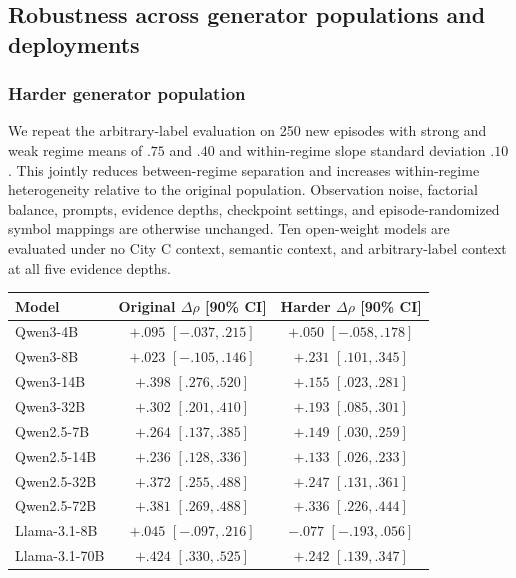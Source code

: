 \subsection{Robustness across generator populations and deployments}
\label{app:coin-city-robustness}

\subsubsection{Harder generator population}

We repeat the arbitrary-label evaluation on 250 new episodes with strong and weak regime means of $.75$ and $.40$ and within-regime slope standard deviation $.10$.
This jointly reduces between-regime separation and increases within-regime heterogeneity relative to the original population.
Observation noise, factorial balance, prompts, evidence depths, checkpoint settings, and episode-randomized symbol mappings are otherwise unchanged.
Ten open-weight models are evaluated under no City C context, semantic context, and arbitrary-label context at all five evidence depths.

\begin{center}
\begin{minipage}{0.90\linewidth}
\centering
{}
\label{tab:coin-city-generator-robustness}
\small
\begin{tabular}{lcc}
\toprule
Model & Original \(\Delta\rho\) [90\% CI] & Harder \(\Delta\rho\) [90\% CI] \\
\midrule
Qwen3-4B & $+.095$ $[-.037,.215]$ & $+.050$ $[-.058,.178]$ \\
Qwen3-8B & $+.023$ $[-.105,.146]$ & $+.231$ $[.101,.345]$ \\
Qwen3-14B & $+.398$ $[.276,.520]$ & $+.155$ $[.023,.281]$ \\
Qwen3-32B & $+.302$ $[.201,.410]$ & $+.193$ $[.085,.301]$ \\
Qwen2.5-7B & $+.264$ $[.137,.385]$ & $+.149$ $[.030,.259]$ \\
Qwen2.5-14B & $+.236$ $[.128,.336]$ & $+.133$ $[.026,.233]$ \\
Qwen2.5-32B & $+.372$ $[.255,.488]$ & $+.247$ $[.131,.361]$ \\
Qwen2.5-72B & $+.381$ $[.269,.488]$ & $+.336$ $[.226,.444]$ \\
Llama-3.1-8B & $+.045$ $[-.097,.216]$ & $-.077$ $[-.193,.056]$ \\
Llama-3.1-70B & $+.424$ $[.330,.525]$ & $+.242$ $[.139,.347]$ \\
\bottomrule
\end{tabular}
\end{minipage}
\end{center}

